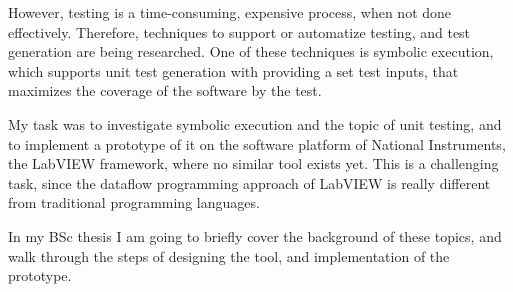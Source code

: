 However, testing is a time-consuming, expensive process, when not done effectively. Therefore, techniques to support or automatize testing, and test generation are being researched. One of these techniques is symbolic execution, which supports unit test generation with providing a set test inputs, that maximizes the coverage of the software by the test.

My task was to investigate symbolic execution and the topic of unit testing, and to implement a prototype of it on the software platform of National Instruments, the LabVIEW framework, where no similar tool exists yet. This is a challenging task, since the dataflow programming approach of LabVIEW is really different from traditional programming languages.

In my BSc thesis I am going to briefly cover the background of these topics, and walk through the steps of designing the tool, and implementation of the prototype.
\vfill
\selectthesislanguage

\setcounter{romanPage}{\value{page}}
